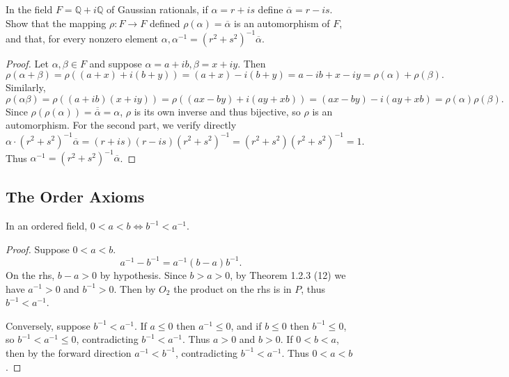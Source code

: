 \begin{tcolorbox}[title=Problem 2, breakable]
    In the field $F = \mathbb{Q} + i\mathbb{Q}$ of Gaussian rationals, if $\alpha = r + is$
    define $\overline{\alpha} = r - is$. Show that the mapping $\rho: F \longrightarrow F$
    defined $\rho(\alpha) = \overline{\alpha}$ is an automorphism of $F$, and that,
    for every nonzero element $\alpha, \alpha^{-1} = (r^2 + s^2)^{-1} \overline{\alpha}$.
\end{tcolorbox}

\begin{proof}
    Let $\alpha, \beta \in F$ and suppose $\alpha = a + ib, \beta = x + iy$.
    Then 
    \[\rho(\alpha + \beta) = \rho((a + x) + i(b + y)) = (a + x) - i(b + y) = a - ib + x - iy = \rho(\alpha) + \rho(\beta).\]
    Similarly,
    \[\rho(\alpha\beta) = \rho((a + ib)(x + iy)) = \rho((ax - by) + i(ay + xb)) = (ax - by) - i(ay + xb) = \rho(\alpha)\rho(\beta).\]
    Since $\rho(\rho(\alpha)) = \overline{\overline{\alpha}} = \alpha$, $\rho$ is its own inverse and thus bijective, so $\rho$ is an automorphism.
    For the second part, we verify directly
    \[\alpha \cdot (r^2 + s^2)^{-1}\overline{\alpha} = (r+is)(r-is)(r^2+s^2)^{-1} = (r^2+s^2)(r^2+s^2)^{-1} = 1.\]
    Thus $\alpha^{-1} = (r^2+s^2)^{-1}\overline{\alpha}$.
\end{proof}

\subsection{The Order Axioms}

\begin{tcolorbox}[title=Problem 1, breakable]
    In an ordered field, $0 < a < b \iff b^{-1} < a^{-1}$.
\end{tcolorbox}

\begin{proof}
    Suppose $0 < a < b$.
    \[a^{-1} - b^{-1} = a^{-1}(b - a)b^{-1}.\]
    On the rhs, $b - a > 0$ by hypothesis. Since $b > a > 0$, by Theorem 1.2.3 (12)
    we have $a^{-1} > 0$ and $b^{-1} > 0$. Then by $O_2$ the product on the rhs is in
    $P$, thus $b^{-1} < a^{-1}$.

    Conversely, suppose $b^{-1} < a^{-1}$. If $a \le 0$ then $a^{-1} \le 0$,
    and if $b \le 0$ then $b^{-1} \le 0$, so $b^{-1} < a^{-1} \le 0$, contradicting
    $b^{-1} < a^{-1}$. Thus $a > 0$ and $b > 0$. If $0 < b < a$, then by the forward
    direction $a^{-1} < b^{-1}$, contradicting $b^{-1} < a^{-1}$. Thus $0 < a < b$.
\end{proof}

